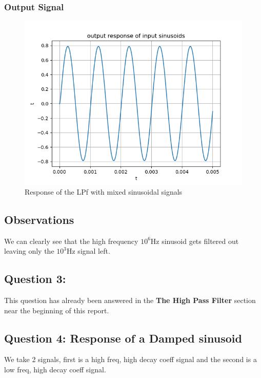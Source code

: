 \documentclass[11pt]{article}
\begin{document}
\subsubsection{Output Signal}
\begin{figure}[H]
    \centering
    \includegraphics[scale = 1]{Figure_4.png}
    \caption{Response of the LPf with mixed sinusoidal signals}
\end{figure}

\subsection{Observations}
We can clearly see that the high frequency $10^6$Hz sinusoid gets filtered out leaving only the $10^3$Hz signal left.


\subsection{Question 3:}
This question has already been answered in the \textbf{The High Pass Filter} section near the beginning of this report.

\subsection{Question 4: Response of a Damped sinusoid}
We take 2 signals, first is a high freq, high decay coeff signal and the second is a low freq, high decay coeff signal.
\end{document}
